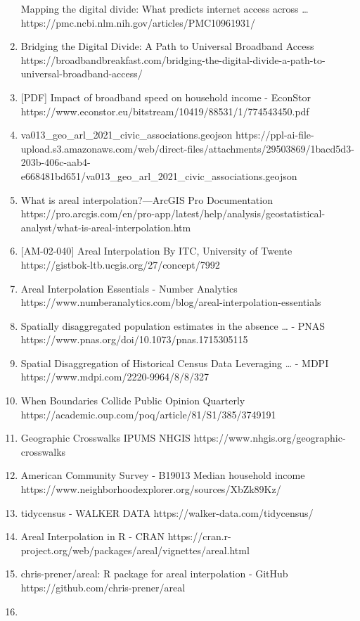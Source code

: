 \documentclass[
  letterpaper,
  DIV=11,
  numbers=noendperiod]{scrartcl}
\begin{document}
\begin{enumerate}
  Mapping the digital divide: What predicts internet access across
  \ldots{} https://pmc.ncbi.nlm.nih.gov/articles/PMC10961931/
\item
  Bridging the Digital Divide: A Path to Universal Broadband Access
  https://broadbandbreakfast.com/bridging-the-digital-divide-a-path-to-universal-broadband-access/
\item
  {[}PDF{]} Impact of broadband speed on household income - EconStor
  https://www.econstor.eu/bitstream/10419/88531/1/774543450.pdf
\item
  va013\_geo\_arl\_2021\_civic\_associations.geojson
  https://ppl-ai-file-upload.s3.amazonaws.com/web/direct-files/attachments/29503869/1bacd5d3-203b-406c-aab4-e668481bd651/va013\_geo\_arl\_2021\_civic\_associations.geojson
\item
  What is areal interpolation?---ArcGIS Pro \textbar{} Documentation
  https://pro.arcgis.com/en/pro-app/latest/help/analysis/geostatistical-analyst/what-is-areal-interpolation.htm
\item
  {[}AM-02-040{]} Areal Interpolation \textbar{} By ITC, University of
  Twente https://gistbok-ltb.ucgis.org/27/concept/7992
\item
  Areal Interpolation Essentials - Number Analytics
  https://www.numberanalytics.com/blog/areal-interpolation-essentials
\item
  Spatially disaggregated population estimates in the absence \ldots{} -
  PNAS https://www.pnas.org/doi/10.1073/pnas.1715305115
\item
  Spatial Disaggregation of Historical Census Data Leveraging \ldots{} -
  MDPI https://www.mdpi.com/2220-9964/8/8/327
\item
  When Boundaries Collide \textbar{} Public Opinion Quarterly
  https://academic.oup.com/poq/article/81/S1/385/3749191
\item
  Geographic Crosswalks \textbar{} IPUMS NHGIS
  https://www.nhgis.org/geographic-crosswalks
\item
  American Community Survey - B19013 Median household income
  https://www.neighborhoodexplorer.org/sources/XbZk89Kz/
\item
  tidycensus - WALKER DATA https://walker-data.com/tidycensus/
\item
  Areal Interpolation in R - CRAN
  https://cran.r-project.org/web/packages/areal/vignettes/areal.html
\item
  chris-prener/areal: R package for areal interpolation - GitHub
  https://github.com/chris-prener/areal
\item

\end{enumerate}
\end{document}
